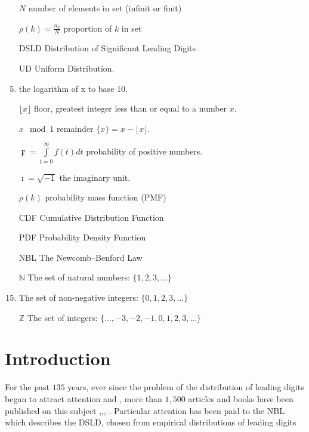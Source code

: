 \documentclass[titlepage,fleqn]{article}%
\begin{document}
\begin{enumerate}[align=right]
\item[$N$]  number of elements  in set (infinit or finit)
\item[$\rho(k)=\frac{n_k}{N}$]  proportion of  $k$  in set
\item[DSLD] Distribution of Significant Leading Digits
\item[UD] Uniform Distribution.
\item[$\displaystyle\log{x}=\frac{\ln{x}}{\ln{10}}%
$] the logarithm of x to base 10.
\item[$\displaystyle\lfloor{x}\rfloor
$] floor, greatest integer less than or equal to a number $x$.
\item[$x\mod{}1$]  remainder
$\{x\}=x-\lfloor{x}\rfloor$.
\item[$\digamma=\int\limits_{t=0}^\infty
f(t) dt$]  probability of positive numbers.
\item[$\imath=\sqrt{-1}$]  the imaginary unit.
\item[$\rho(k)$]  probability mass function (PMF)
\item[CDF]  Cumulative Distribution Function
\item[PDF]  Probability Density Function
\item[NBL]  The Newcomb--Benford Law \cite{formann0}
\item[$\mathbb{N}$] The set of natural numbers: $\{1, 2, 3, . . .\}$
\item[$\mathbb{Z}^{*}%
$] The set of non-negative integers: $\{0,1, 2, 3, . . .\}$
\item[$\mathbb{Z}$] The set of integers: $\{...,-3,-2,-1,0,1, 2, 3, . . .\}$
\end{enumerate}


\section{Introduction}%

\label{introduction}%


For the past $135$ years, ever since the problem of the distribution of
leading digits began to attract attention
\cite{newcombs}  and \cite{benford}%
, more than $1,500$ articles and books have been published on this subject
\cite{hill},\cite{bergerhill},\cite{arnotheodore},\cite{miller}%
. Particular attention has been paid to the NBL which describes the DSLD,
chosen from empirical distributions of leading digits%
\end{document}
